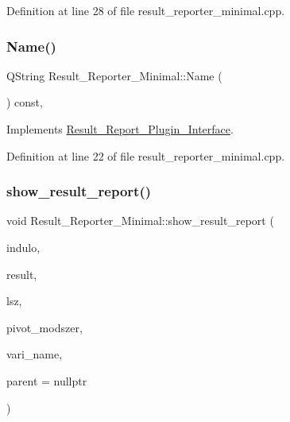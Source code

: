 Definition at line 28 of file result\+\_\+reporter\+\_\+minimal.\+cpp.

\mbox{\label{classResult__Reporter__Minimal_ae6bd38556e2b7b724ab077574665aae5}} 
\subsubsection{\texorpdfstring{Name()}{Name()}}
{\footnotesize\ttfamily Q\+String Result\+\_\+\+Reporter\+\_\+\+Minimal\+::\+Name (\begin{DoxyParamCaption}{ }\end{DoxyParamCaption}) const\hspace{0.3cm}{\ttfamily [override]}, {\ttfamily [virtual]}}



Implements \hyperlink{classResult__Report__Plugin__Interface_ad86b327f9bebee3f52666abeea1ca03f}{Result\+\_\+\+Report\+\_\+\+Plugin\+\_\+\+Interface}.



Definition at line 22 of file result\+\_\+reporter\+\_\+minimal.\+cpp.

\mbox{\label{classResult__Reporter__Minimal_af40ff386283122012cf55bf9c415fa71}} 
\subsubsection{\texorpdfstring{show\+\_\+result\+\_\+report()}{show\_result\_report()}}
{\footnotesize\ttfamily void Result\+\_\+\+Reporter\+\_\+\+Minimal\+::show\+\_\+result\+\_\+report (\begin{DoxyParamCaption}\item[{Q\+Standard\+Item\+Model $\ast$}]{indulo,  }\item[{Q\+Standard\+Item\+Model $\ast$}]{result,  }\item[{int}]{lsz,  }\item[{Q\+String}]{pivot\+\_\+modszer,  }\item[{Q\+String}]{vari\+\_\+name,  }\item[{Q\+Widget $\ast$}]{parent = {\ttfamily nullptr} }\end{DoxyParamCaption})\hspace{0.3cm}{\ttfamily [virtual]}}



